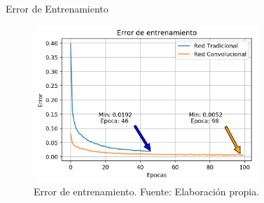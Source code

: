 \documentclass[10pt]{beamer}
\begin{document}
\begin{frame}{Error de Entrenamiento}
    \begin{figure}[!ht] 
        \centering
        \includegraphics[width=0.75\textwidth]{../img/trainloss}
        \caption[Error de entrenamiento]{Error de entrenamiento. Fuente: Elaboración propia. }
        \label{fig:trainloss}
    \end{figure}
    
\end{frame}

    
\end{document}
